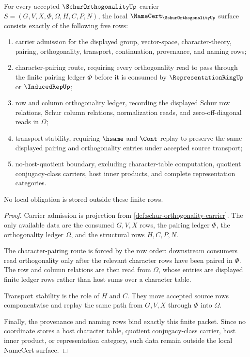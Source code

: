 \begin{theorem}
\label{thm:schur-orthogonality-namecert-obligations}
For every accepted $\SchurOrthogonalityUp$ carrier $S=(G,V,X,\Phi,\Omega,H,C,P,N)$, the local $\NameCert_{\SchurOrthogonalityUp}$ surface consists exactly of the following five rows:
\begin{enumerate}
\item carrier admission for the displayed group, vector-space, character-theory, pairing, orthogonality, transport, continuation, provenance, and naming rows;
\item character-pairing route, requiring every orthogonality read to pass through the finite pairing ledger $\Phi$ before it is consumed by $\RepresentationRingUp$ or $\InducedRepUp$;
\item row and column orthogonality ledger, recording the displayed Schur row relations, Schur column relations, normalization reads, and zero-off-diagonal reads in $\Omega$;
\item transport stability, requiring $\hsame$ and $\Cont$ replay to preserve the same displayed pairing and orthogonality entries under accepted source transport;
\item no-host-quotient boundary, excluding character-table computation, quotient conjugacy-class carriers, host inner products, and complete representation categories.
\end{enumerate}
No local obligation is stored outside these finite rows.
\end{theorem}
\begin{proof}
Carrier admission is projection from \autoref{def:schur-orthogonality-carrier}. The only available data are the consumed $G,V,X$ rows, the pairing ledger $\Phi$, the orthogonality ledger $\Omega$, and the structural rows $H,C,P,N$.

The character-pairing route is forced by the row order: downstream consumers read orthogonality only after the relevant character rows have been paired in $\Phi$. The row and column relations are then read from $\Omega$, whose entries are displayed finite ledger rows rather than host sums over a character table.

Transport stability is the role of $H$ and $C$. They move accepted source rows componentwise and replay the same path from $G,V,X$ through $\Phi$ into $\Omega$.

Finally, the provenance and naming rows bind exactly this finite packet. Since no coordinate stores a host character table, quotient conjugacy-class carrier, host inner product, or representation category, such data remain outside the local NameCert surface.
\end{proof}

